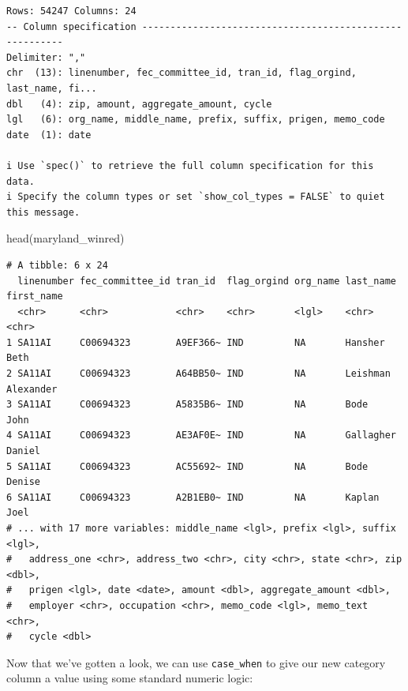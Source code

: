 \documentclass[
  letterpaper,
  DIV=11,
  numbers=noendperiod]{scrreprt}
\newenvironment{Shaded}{\begin{snugshade}}{\end{snugshade}}
\newcommand{\FunctionTok}[1]{\textcolor[rgb]{0.28,0.35,0.67}{#1}}
\newcommand{\NormalTok}[1]{\textcolor[rgb]{0.00,0.23,0.31}{#1}}
\begin{document}
\begin{verbatim}
Rows: 54247 Columns: 24
-- Column specification --------------------------------------------------------
Delimiter: ","
chr  (13): linenumber, fec_committee_id, tran_id, flag_orgind, last_name, fi...
dbl   (4): zip, amount, aggregate_amount, cycle
lgl   (6): org_name, middle_name, prefix, suffix, prigen, memo_code
date  (1): date

i Use `spec()` to retrieve the full column specification for this data.
i Specify the column types or set `show_col_types = FALSE` to quiet this message.
\end{verbatim}

\begin{Shaded}
\begin{Highlighting}[]
\FunctionTok{head}\NormalTok{(maryland\_winred)}
\end{Highlighting}
\end{Shaded}

\begin{verbatim}
# A tibble: 6 x 24
  linenumber fec_committee_id tran_id  flag_orgind org_name last_name first_name
  <chr>      <chr>            <chr>    <chr>       <lgl>    <chr>     <chr>     
1 SA11AI     C00694323        A9EF366~ IND         NA       Hansher   Beth      
2 SA11AI     C00694323        A64BB50~ IND         NA       Leishman  Alexander 
3 SA11AI     C00694323        A5835B6~ IND         NA       Bode      John      
4 SA11AI     C00694323        AE3AF0E~ IND         NA       Gallagher Daniel    
5 SA11AI     C00694323        AC55692~ IND         NA       Bode      Denise    
6 SA11AI     C00694323        A2B1EB0~ IND         NA       Kaplan    Joel      
# ... with 17 more variables: middle_name <lgl>, prefix <lgl>, suffix <lgl>,
#   address_one <chr>, address_two <chr>, city <chr>, state <chr>, zip <dbl>,
#   prigen <lgl>, date <date>, amount <dbl>, aggregate_amount <dbl>,
#   employer <chr>, occupation <chr>, memo_code <lgl>, memo_text <chr>,
#   cycle <dbl>
\end{verbatim}

Now that we've gotten a look, we can use \texttt{case\_when} to give our
new category column a value using some standard numeric logic:
\end{document}
